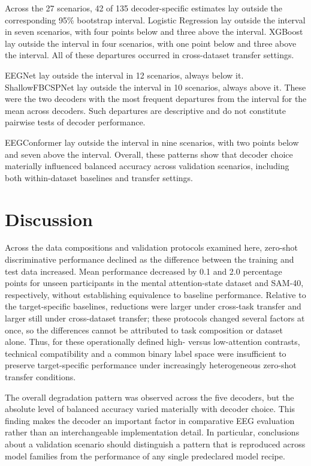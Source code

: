 \documentclass[10pt,letterpaper]{article}
\begin{document}


Across the 27 scenarios, 42 of 135 decoder-specific estimates lay outside the
corresponding 95\% bootstrap interval. Logistic Regression lay outside the
interval in seven scenarios, with four points below and three above the
interval. XGBoost lay outside the interval in four scenarios, with one point
below and three above the interval. All of these departures occurred in
cross-dataset transfer settings.

EEGNet lay outside the interval in 12 scenarios, always below it.
ShallowFBCSPNet lay outside the interval in 10 scenarios, always above it.
These were the two decoders with the most frequent departures from the
interval for the mean across decoders. Such departures are descriptive and
do not constitute pairwise tests of decoder performance.

EEGConformer lay outside the interval in nine scenarios, with two points below
and seven above the interval. Overall, these patterns show that decoder choice
materially influenced balanced accuracy across validation scenarios, including
both within-dataset baselines and transfer settings.

\section*{Discussion}

Across the data compositions and validation protocols examined here, zero-shot
discriminative performance declined as the difference between the training and
test data increased. Mean performance decreased by 0.1 and 2.0 percentage points for unseen
participants in the mental attention-state dataset and SAM-40, respectively,
without establishing equivalence to baseline performance. Relative to the
target-specific baselines, reductions were larger under cross-task transfer and
larger still under cross-dataset transfer; these protocols changed several
factors at once, so the differences cannot be attributed to task composition
or dataset alone. Thus, for these operationally defined high- versus
low-attention contrasts, technical compatibility and a common binary label space
were insufficient to preserve target-specific performance under increasingly
heterogeneous zero-shot transfer conditions.

\medskip

The overall degradation pattern was observed across the five decoders, but the
absolute level of balanced accuracy varied materially with decoder choice.
This finding makes the decoder an important factor in comparative EEG
evaluation rather than an interchangeable implementation detail. In
particular, conclusions about a validation scenario should distinguish a
pattern that is reproduced across model families from the performance of any
single predeclared model recipe.
\end{document}
